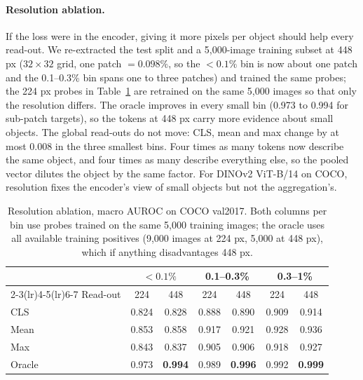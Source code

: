 \documentclass[10pt,letterpaper,twocolumn]{article}
\begin{document}
\paragraph{Resolution ablation.}
If the loss were in the encoder, giving it more pixels per object should help every read-out.
We re-extracted the test split and a 5,000-image training subset at 448 px ($32\times32$ grid,
one patch $=0.098\%$, so the $<0.1\%$ bin is now about one patch and the 0.1--0.3\% bin spans
one to three patches) and trained the same probes; the 224 px probes in
Table~\ref{tab:resolution} are retrained on the same 5,000 images so that only the resolution
differs. The oracle improves in every small bin (0.973 to 0.994 for sub-patch targets), so the
tokens at 448 px carry more evidence about small objects. The global read-outs do not move:
CLS, mean and max change by at most 0.008 in the three smallest bins. Four times as many tokens
now describe the same object, and four times as many describe everything else, so the pooled
vector dilutes the object by the same factor. For DINOv2 ViT-B/14 on COCO, resolution fixes the
encoder's view of small objects but not the aggregation's.

\begin{table}[t]
\centering\small
\caption{Resolution ablation, macro AUROC on COCO val2017. Both columns per bin use probes
trained on the same 5,000 training images; the oracle uses all available training positives
(9,000 images at 224 px, 5,000 at 448 px), which if anything disadvantages 448 px.}
\label{tab:resolution}
\begin{tabular}{l cc cc cc}
\toprule
 & \multicolumn{2}{c}{$<0.1\%$} & \multicolumn{2}{c}{0.1--0.3\%} & \multicolumn{2}{c}{0.3--1\%} \\
\cmidrule(lr){2-3}\cmidrule(lr){4-5}\cmidrule(lr){6-7}
Read-out & 224 & 448 & 224 & 448 & 224 & 448 \\
\midrule
CLS    & 0.824 & 0.828 & 0.888 & 0.890 & 0.909 & 0.914 \\
Mean   & 0.853 & 0.858 & 0.917 & 0.921 & 0.928 & 0.936 \\
Max    & 0.843 & 0.837 & 0.905 & 0.906 & 0.918 & 0.927 \\
\midrule
Oracle & 0.973 & \textbf{0.994} & 0.989 & \textbf{0.996} & 0.992 & \textbf{0.999} \\
\bottomrule
\end{tabular}
\end{table}
\end{document}

